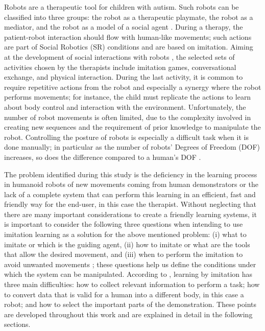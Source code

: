 \documentclass[thesis]{mas_proposal}
\begin{document}
\begin{itemize}
    Robots are a therapeutic tool for children with autism. Such robots can be classified into three groups: the robot as a therapeutic playmate, the robot as a mediator, and the robot as a model of a social agent \cite{Dautenhahn_2003}. During a therapy, the patient-robot interaction should flow with human-like movements; such actions are part of Social Robotics (SR) conditions and are based on imitation. Aiming at the development of social interactions with robots \cite{Pennazio_2017}, the selected sets of activities chosen by the therapists include imitation games, conversational exchange, and physical interaction. During the last activity, it is common to require repetitive actions from the robot and especially a synergy where the robot performs movements; for instance, the child must replicate the actions to learn about body control and interaction with the environment. Unfortunately, the number of robot movements is often limited, due to the complexity involved in creating new sequences and the requirement of prior knowledge to manipulate the robot. Controlling the posture of robots is especially a difficult task when it is done manually; in particular as the number of robots' Degrees of Freedom (DOF) increases, so does the difference compared to a human's DOF \cite{Fadli2018}. 
    
    The problem identified during this study is the deficiency in the learning process in humanoid robots of new movements coming from human demonstrators or the lack of a complete system that can perform this learning in an efficient, fast and friendly way for the end-user, in this case the therapist. Without neglecting that there are many important considerations to create a friendly learning systems, it is important to consider the following three questions when intending to use imitation learning as a solution for the above mentioned problem: (i) what to imitate or which is the guiding agent, (ii) how to imitate or what are the tools that allow the desired movement, and (iii) when to perform the imitation to avoid unwanted movements \cite{Billard_2004}; these questions help us define the conditions under which the system can be manipulated. According to \cite{lopes2005developmental}, learning by imitation has three main difficulties: how to collect relevant information to perform a task; how to convert data that is valid for a human into a different body, in this case a robot; and how to select the important parts of the demonstration. These points are developed throughout this work and are explained in detail in the following sections.
    

\end{itemize}
\end{document}
